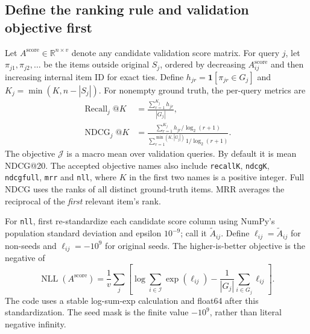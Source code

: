 \documentclass[11pt,a4paper]{article}
\newcommand{\code}[1]{\nolinkurl{#1}}
\newcommand{\R}{\mathbb R}
\newcommand{\I}{\mathcal I}
\numberwithin{equation}{section}
\begin{document}
\subsection{Define the ranking rule and validation objective first}\label{sec:objectives}
Let $A^{\mathrm{score}}\in\R^{n\times v}$ denote any candidate validation score matrix.
For query $j$, let $\pi_{j1},\pi_{j2},\ldots$ be the items outside original $S_j$, ordered
by decreasing $A^{\mathrm{score}}_{ij}$ and then increasing internal item ID for exact ties.
Define $h_{jr}=\mathbf1[\pi_{jr}\in G_j]$ and
$K_j=\min(K,n-|S_j|)$. For nonempty ground truth, the per-query metrics are
\begin{align}
 \operatorname{Recall}_j@K&=\frac{\sum_{r=1}^{K_j}h_{jr}}{|G_j|},\\
 \operatorname{NDCG}_j@K&=
 \frac{\sum_{r=1}^{K_j}h_{jr}/\log_2(r+1)}
      {\sum_{r=1}^{\min(K,|G_j|)}1/\log_2(r+1)}.
\end{align}
The objective $\mathcal J$ is a macro mean over validation queries. By default it is mean
NDCG@20. The accepted objective names also include \code{recallK}, \code{ndcgK},
\code{ndcgfull}, \code{mrr} and \code{nll}, where $K$ in the first two names is a positive
integer. Full NDCG uses the ranks of all distinct ground-truth items. MRR averages the
reciprocal of the \emph{first} relevant item's rank.

For \code{nll}, first re-standardize each candidate score column using NumPy's population
standard deviation and epsilon $10^{-9}$; call it $\widetilde A_{ij}$. Define
$\ell_{ij}=\widetilde A_{ij}$ for non-seeds and $\ell_{ij}=-10^9$ for original seeds.
The higher-is-better objective is the negative of
\begin{equation}
 \operatorname{NLL}(A^{\mathrm{score}})=\frac1v\sum_j
 \left[\log\sum_{i\in\I}\exp(\ell_{ij})
       -\frac1{|G_j|}\sum_{i\in G_j}\ell_{ij}\right].
\end{equation}
The code uses a stable log-sum-exp calculation and float64 after this standardization.
The seed mask is the finite value $-10^9$, rather than literal negative infinity.
\end{document}

